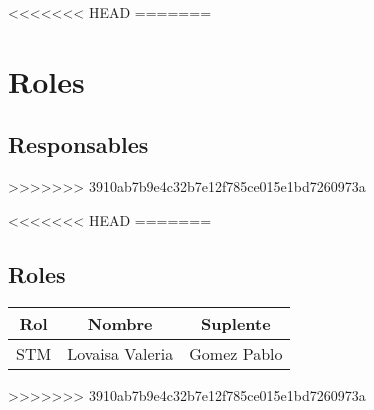 <<<<<<< HEAD
=======
\newpage
\section{\textcolor[gray]{.2}{Roles}}
\subsection{\textcolor[gray]{.2}{Responsables}}
>>>>>>> 3910ab7b9e4c32b7e12f785ce015e1bd7260973a





<<<<<<< HEAD
=======
\subsection{\textcolor[gray]{.2}{Roles}}
\begin{table}[!h]
\begin{center}
\begin{tabular}{|c|c|c|}
\hline
\rowcolor[gray]{.8} Rol & Nombre & Suplente\\
\hline
STM & Lovaisa Valeria & Gomez Pablo\\
\hline
\end{tabular}
\end{center}
\end{table}
>>>>>>> 3910ab7b9e4c32b7e12f785ce015e1bd7260973a

